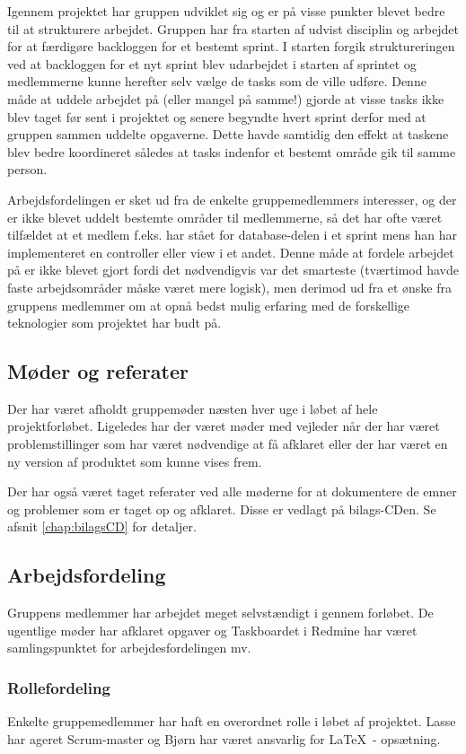 Igennem projektet har gruppen udviklet sig og er på visse punkter blevet bedre til at strukturere arbejdet. Gruppen har fra starten af udvist disciplin og arbejdet for at færdigøre backloggen for et bestemt sprint. I starten forgik struktureringen ved at backloggen for et nyt sprint blev udarbejdet i starten af sprintet og medlemmerne kunne herefter selv vælge de tasks som de ville udføre. Denne måde at uddele arbejdet på (eller mangel på samme!) gjorde at visse tasks ikke blev taget før sent i projektet og senere begyndte hvert sprint derfor med at gruppen sammen uddelte opgaverne. Dette havde samtidig den effekt at taskene blev bedre koordineret således at tasks indenfor et bestemt område gik til samme person. 

Arbejdsfordelingen er sket ud fra de enkelte gruppemedlemmers interesser, og der er ikke blevet uddelt bestemte områder til medlemmerne, så det har ofte været tilfældet at et medlem f.eks. har stået for database-delen i et sprint mens han har implementeret en controller eller view i et andet. Denne måde at fordele arbejdet på er ikke blevet gjort fordi det nødvendigvis var det smarteste (tværtimod havde faste arbejdsområder måske været mere logisk), men derimod ud fra et ønske fra gruppens medlemmer om at opnå bedst mulig erfaring med de forskellige teknologier som projektet har budt på.

\subsection{Møder og referater}
Der har været afholdt gruppemøder næsten hver uge i løbet af hele projektforløbet. Ligeledes har der været møder med vejleder når der har været problemstillinger som har været nødvendige at få afklaret eller der har været en ny version af produktet som kunne vises frem.

Der har også været taget referater ved alle møderne for at dokumentere de emner og problemer som er taget op og afklaret. Disse er vedlagt på bilags-CDen. Se afsnit \ref{chap:bilagsCD} for detaljer.

\subsection{Arbejdsfordeling}
Gruppens medlemmer har arbejdet meget selvstændigt i gennem forløbet. De ugentlige møder har afklaret opgaver og Taskboardet i Redmine har været samlingspunktet for arbejdesfordelingen mv.

\subsubsection{Rollefordeling}
Enkelte gruppemedlemmer har haft en overordnet rolle i løbet af projektet.
Lasse har ageret Scrum-master og Bjørn har været ansvarlig for \LaTeX\ - opsætning.
